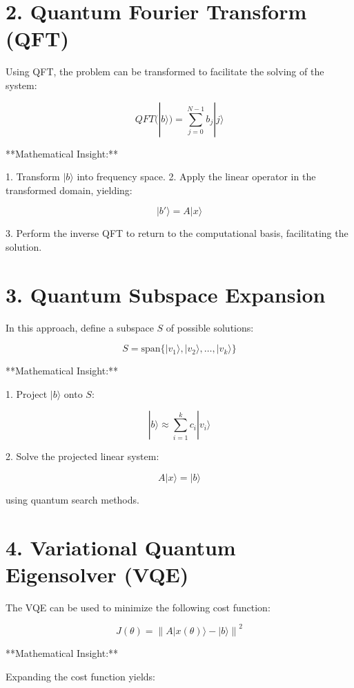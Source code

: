 \documentclass{article}
\begin{document}
\section{2. Quantum Fourier Transform (QFT)}

Using QFT, the problem can be transformed to facilitate the solving of the system:

\begin{equation}
QFT(|b\rangle) = \sum_{j=0}^{N-1} b_j |j\rangle
\end{equation}

**Mathematical Insight:**

1. Transform \( |b\rangle \) into frequency space.
2. Apply the linear operator in the transformed domain, yielding:

\[
|b'\rangle = A |x\rangle
\]

3. Perform the inverse QFT to return to the computational basis, facilitating the solution.

\section{3. Quantum Subspace Expansion}

In this approach, define a subspace \( S \) of possible solutions:

\[
S = \text{span}\{|v_1\rangle, |v_2\rangle, \ldots, |v_k\rangle\}
\]

**Mathematical Insight:**

1. Project \( |b\rangle \) onto \( S \):

\[
|b\rangle \approx \sum_{i=1}^{k} c_i |v_i\rangle
\]

2. Solve the projected linear system:

\[
A |x\rangle = |b\rangle
\]

using quantum search methods.

\section{4. Variational Quantum Eigensolver (VQE)}

The VQE can be used to minimize the following cost function:

\begin{equation}
J(\theta) = \left\| A |x(\theta)\rangle - |b\rangle \right\|^2
\end{equation}

**Mathematical Insight:**

Expanding the cost function yields:
\end{document}
